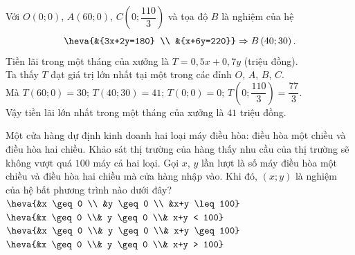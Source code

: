 \begin{ex}
{\begin{itemchoice}
			Với $O\left(0; 0\right)$, $A\left(60; 0\right)$, $C\left(0; \dfrac{110}{3}\right)$ và tọa độ $B$ là nghiệm của hệ  
			$$\heva{&{3x+2y=180} \\ &{x+6y=220}} \Rightarrow B\left(40; 30\right).$$
			Tiền lãi trong một tháng của xưởng là $T=0{,}5x+0{,}7y$ (triệu đồng).\\
			Ta thấy $T$ đạt giá trị lớn nhất tại một trong các đỉnh $O$, $A$, $B$, $C$. \\
			Mà $T\left(60;0\right)=30$; $T\left(40;30\right)=41$; $T\left(0;0\right)=0$; $T\left(0;\dfrac{110}{3}\right)=\dfrac{77}{3}$.\\
			Vậy tiền lãi lớn nhất trong một tháng của xưởng là $41$ triệu đồng.
		\end{itemchoice} 
	} 
\end{ex}

\begin{ex}
	Một cửa hàng dự định kinh doanh hai loại máy điều hòa: điều hòa một chiều và điều hòa hai chiều. Khảo sát thị trường của hàng thấy nhu cầu của thị trường sẽ không vượt quá $100$ máy cả hai loại. Gọi $x$, $y$ lần lượt là số máy điều hòa một chiều và điều hòa hai chiều mà cửa hàng nhập vào. Khi đó, $(x; y)$ là nghiệm của hệ bất phương trình nào dưới đây?
	\choice
	{\True $\heva{&x \geq 0 \\ &y \geq 0 \\ &x+y \leq 100}$}
	{$\heva{&x \geq 0 \\& y \geq 0 \\& x+y < 100}$}
	{$\heva{&x \geq 0 \\& y \geq 0 \\& x+y \geq 100}$}
	{$\heva{&x \geq 0 \\& y \geq 0 \\& x+y > 100}$}
\end{ex}

